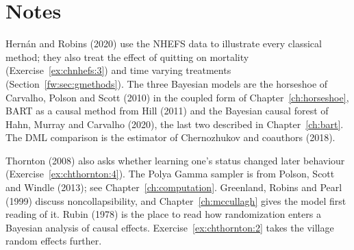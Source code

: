 \section*{Notes}

Hern\'an and Robins (2020) use the NHEFS data to illustrate every classical method; they also treat the effect of quitting on mortality (Exercise~\ref{ex:chnhefs:3}) and time varying treatments (Section~\ref{fw:sec:gmethods}). The three Bayesian models are the horseshoe of Carvalho, Polson and Scott (2010) in the coupled form of Chapter~\ref{ch:horseshoe}, BART as a causal method from Hill (2011) and the Bayesian causal forest of Hahn, Murray and Carvalho (2020), the last two described in Chapter~\ref{ch:bart}. The DML comparison is the estimator of Chernozhukov and coauthors (2018).

Thornton (2008) also asks whether learning one's status changed later behaviour (Exercise~\ref{ex:chthornton:4}). The Polya Gamma sampler is from Polson, Scott and Windle (2013); see Chapter~\ref{ch:computation}. Greenland, Robins and Pearl (1999) discuss noncollapsibility, and Chapter~\ref{ch:mccullagh} gives the model first reading of it. Rubin (1978) is the place to read how randomization enters a Bayesian analysis of causal effects. Exercise~\ref{ex:chthornton:2} takes the village random effects further.


